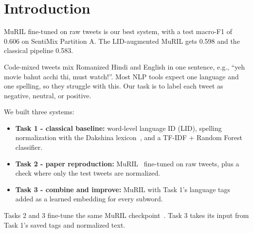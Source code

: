\section{Introduction}

MuRIL fine-tuned on raw tweets is our best system, with a test macro-F1 of 0.606 on SentiMix Partition A. The LID-augmented MuRIL gets 0.598 and the classical pipeline 0.583.

Code-mixed tweets mix Romanized Hindi and English in one sentence, e.g., ``yeh movie bahut acchi thi, must watch!''. Most NLP tools expect one language and one spelling, so they struggle with this. Our task is to label each tweet as negative, neutral, or positive.

We built three systems:
\begin{itemize}
    \item \textbf{Task 1 - classical baseline:} word-level language ID (LID), spelling normalization with the Dakshina lexicon~\cite{roark2020dakshina}, and a TF-IDF + Random Forest classifier.
    \item \textbf{Task 2 - paper reproduction:} MuRIL~\cite{khanuja2021muril} fine-tuned on raw tweets, plus a check where only the test tweets are normalized.
    \item \textbf{Task 3 - combine and improve:} MuRIL with Task 1's language tags added as a learned embedding for every subword.
\end{itemize}

Tasks 2 and 3 fine-tune the same MuRIL checkpoint~\cite{khanuja2021muril}. Task 3 takes its input from Task 1's saved tags and normalized text.
